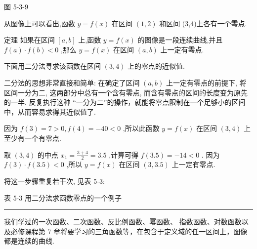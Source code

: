 \documentclass[10pt]{article}
\newcommand{\HRule}{\begin{center}\rule{0.9\linewidth}{0.2mm}\end{center}}
\begin{document}
图 5-3-9

从图像上可以看出,函数 \(y = f\left( x\right)\) 在区间 \(\left( {1,2}\right)\) 和区间 (3,4)上各有一个零点.

定理 如果在区间 \(\left\lbrack  {a,b}\right\rbrack\) 上,函数 \(y = f\left( x\right)\) 的图像是一段连续曲线,并且 \(f\left( a\right)  \cdot  f\left( b\right)  < 0\) ,那么 \(y = f\left( x\right)\) 在区间 \(\left( {a,b}\right)\) 上一定有零点.

下面用二分法寻求该函数在区间 \(\left( {3,4}\right)\) 上的零点的近似值.

二分法的思想非常直接和简单: 在确定了区间 \(\left( {a,b}\right)\) 上一定有零点的前提下, 将区间一分为二, 这两部分中总有一个含有零点, 而含有零点的区间的长度变为原先的一半. 反复执行这种 “一分为二”的操作，就能将零点限制在一个足够小的区间中，从而容易求得其近似值了.

因为 \(f\left( 3\right)  = 7 > 0,f\left( 4\right)  =  - {40} < 0\) ,所以此函数 \(y = f\left( x\right)\) 在区间 \(\left( {3,4}\right)\) 上至少有一个有零点.

取 \(\left( {3,4}\right)\) 的中点 \({x}_{1} = \frac{3 + 4}{2} = {3.5}\) ,计算可得 \(f\left( {3.5}\right)  =  - {14} < 0\) . 因为 \(f\left( 3\right)  \cdot  f\left( {3.5}\right)  < 0\) ,所以 \(y = f\left( x\right)\) 在区间 \(\left( {3,{3.5}}\right)\) 上一定有零点.

将这一步骤重复若干次, 见表 5-3:

表 5-3 用二分法求函数零点的一个例子

\begin{center}
\end{center}

\HRule

我们学过的一次函数、二次函数、反比例函数、幂函数、 指数函数、对数函数以及必修课程第 7 章将要学习的三角函数等，在包含于定义域的任一区间上，图像都是连续的曲线.
\end{document}
